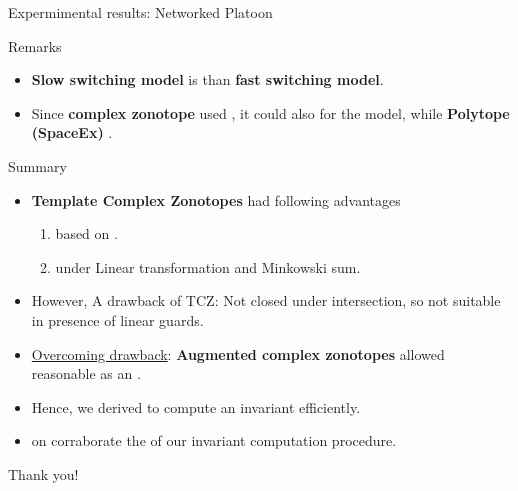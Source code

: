 \begin{frame}{Expermimental results: Networked Platoon}
\begin{table}
\begin{alertblock}{Remarks}
\begin{itemize}
\item {\bf Slow switching model} is  than {\bf fast switching model}.
\item Since {\bf complex zonotope} used , it could also  for the  model, while  {\bf Polytope (SpaceEx)} .
\end{itemize}
\end{alertblock}
\end{table}
\end{frame}

\begin{frame}{Summary}
\begin{itemize}
\item {\bf Template Complex Zonotopes} had following advantages 
\begin{enumerate}
\item {} based on .
\item {} under {\color{violet} Linear transformation and Minkowski sum}.
\end{enumerate}
\item However, {\color{red} A drawback of TCZ: Not closed under intersection}, so {\color{red} not suitable} in presence of {\color{red} linear guards}.
\item \underline{Overcoming drawback}: {\bf {Augmented complex zonotopes}} allowed reasonable  as an .
\item Hence, we derived \underline{} to compute an invariant efficiently.
\item {} on  corraborate the  of our invariant computation procedure.
\end{itemize}
\end{frame}

\begin{frame}{}
\center
{\Huge {\color{blue} Thank you!}}
\end{frame}


















